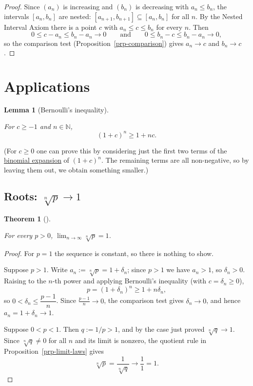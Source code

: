 \documentclass[
  letterpaper,
  DIV=11,
  numbers=noendperiod]{scrreprt}
\theoremstyle{plain}
\newtheorem{lemma}{Lemma}[chapter]
\theoremstyle{plain}
\theoremstyle{definition}
\theoremstyle{definition}
\theoremstyle{definition}
\theoremstyle{plain}
\newtheorem{theorem}{Theorem}[chapter]
\theoremstyle{plain}
\theoremstyle{remark}
\begin{document}
\begin{proof}
Since \((a_n)\) is increasing and \((b_n)\) is decreasing with
\(a_n\le b_n\), the intervals \([a_n,b_n]\) are nested:
\([a_{n+1},b_{n+1}]\subseteq[a_n,b_n]\) for all \(n\). By the Nested
Interval Axiom there is a point \(c\) with \(a_n \le c \le b_n\) for
every \(n\). Then \[
0 \le c - a_n \le b_n - a_n \to 0 \qquad\text{and}\qquad 0 \le b_n - c \le b_n - a_n \to 0,
\] so the comparison test (Proposition~\ref{prp-comparison}) gives
\(a_n \to c\) and \(b_n \to c\).
\end{proof}

\section{Applications}\label{applications}

\begin{lemma}[Bernoulli's
inequality]\protect\hypertarget{lem-bernoulli}{}\label{lem-bernoulli}

For \(c \ge -1\) and \(n\in\mathbb{N}\), \[
(1+c)^n \ge 1 + nc.
\]

\end{lemma}

(For \(c \geq 0\) one can prove this by considering just the first two
terms of the
\href{https://en.wikipedia.org/wiki/Binomial_theorem}{binomial
expansion} of \((1+c)^n\). The remaining terms are all non-negative, so
by leaving them out, we obtain something smaller.)

\subsection{\texorpdfstring{Roots:
\(\sqrt[n]{p} \to 1\)}{Roots: \textbackslash sqrt{[}n{]}\{p\} \textbackslash to 1}}\label{roots-sqrtnp-to-1}

\begin{theorem}[]\protect\hypertarget{thm-nth-root}{}\label{thm-nth-root}

\hfill\break
For every \(p>0\), \(\displaystyle\lim_{n\to\infty}\sqrt[n]{p} = 1\).

\end{theorem}

\begin{proof}
For \(p=1\) the sequence is constant, so there is nothing to show.

Suppose \(p>1\). Write \(a_n := \sqrt[n]{p} = 1+\delta_n\); since
\(p>1\) we have \(a_n>1\), so \(\delta_n>0\). Raising to the \(n\)-th
power and applying Bernoulli's inequality (with \(c=\delta_n\ge0\)), \[
p = (1+\delta_n)^n \ge 1+n\delta_n,
\] so \(0 < \delta_n \le \dfrac{p-1}{n}\). Since \(\tfrac{p-1}{n}\to0\),
the comparison test gives \(\delta_n\to0\), and hence
\(a_n = 1+\delta_n \to 1\).

Suppose \(0<p<1\). Then \(q:=1/p>1\), and by the case just proved
\(\sqrt[n]{q}\to1\). Since \(\sqrt[n]{q}\neq0\) for all \(n\) and its
limit is nonzero, the quotient rule in Proposition~\ref{prp-limit-laws}
gives \[
\sqrt[n]{p} = \frac{1}{\sqrt[n]{q}} \longrightarrow \frac11 = 1.
\]
\end{proof}
\end{document}
